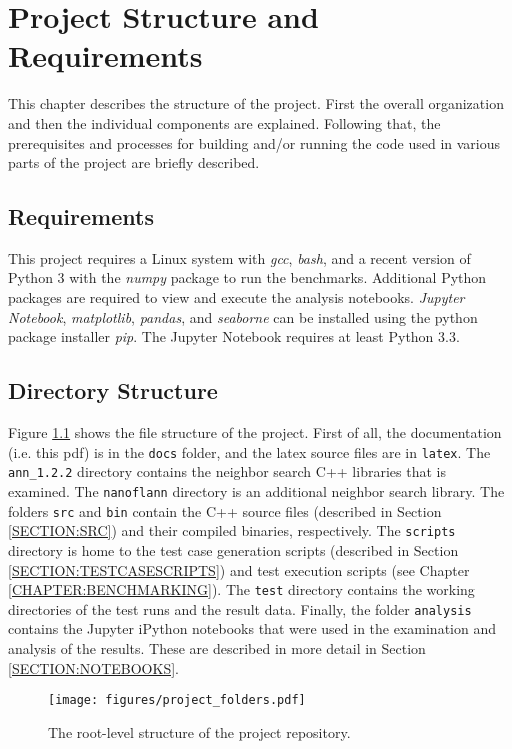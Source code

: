 
\chapter{Project Structure and Requirements}

This chapter describes the structure of the project. First the overall organization and then the individual components are explained. Following that, the prerequisites and processes for building and/or running the code used in various parts of the project are briefly described.

\section{Requirements}
\label{SECTION:REQS}
This project requires a Linux system with {\itshape gcc}, {\itshape bash}, and a recent version of Python 3 with the {\itshape numpy} package to run the benchmarks. Additional Python packages are required to view and execute the analysis notebooks. {\itshape Jupyter Notebook}, {\itshape matplotlib},  {\itshape pandas}, and {\itshape seaborne} can be installed using the python package installer {\itshape pip}. The Jupyter Notebook requires at least Python 3.3.

\section{Directory Structure}
Figure \ref{FIG:folders} shows the file structure of the project.  First of all, the documentation (i.e.  this pdf) is in the \texttt{docs} folder, and the latex source files are in \texttt{latex}. The \texttt{ann\_1.2.2} directory contains the neighbor search C++ libraries that is examined. The \texttt{nanoflann} directory is an additional neighbor search library.  The folders \texttt{src} and \texttt{bin} contain the C++ source files (described in Section \ref{SECTION:SRC}) and their compiled binaries, respectively.  The \texttt{scripts} directory is home to the test case generation scripts (described in Section \ref{SECTION:TESTCASESCRIPTS}) and test execution scripts (see Chapter \ref{CHAPTER:BENCHMARKING}).  The \texttt{test} directory contains the working directories of the test runs and the result data.   Finally, the folder \texttt{analysis} contains the Jupyter iPython notebooks that were used in the examination and analysis of the results.  These are described in more detail in Section \ref{SECTION:NOTEBOOKS}.

\begin{figure}[h]
	\centering
	\texttt{[image: figures/project\_folders.pdf]}
	\caption{The root-level structure of the project repository.}
      \label{FIG:folders}
\end{figure}

